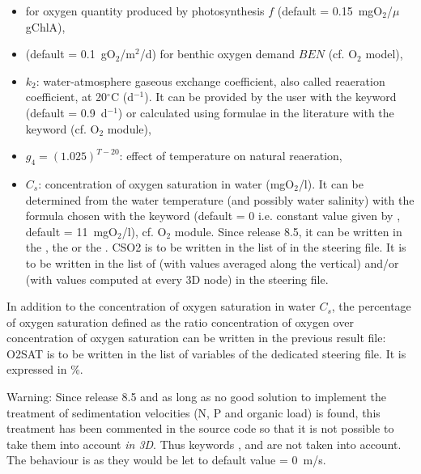 \begin{itemize}
\item {}
  for oxygen quantity produced by photosynthesis $f$
  (default = 0.15~mgO$_2$/$\mu$gChlA),
\item  {} (default = 0.1~gO$_2$/m$^2$/d)
  for benthic oxygen demand $BEN$ (cf. O$_2$ model),
\item $k_2$: water-atmosphere gaseous exchange coefficient,
  also called reaeration coefficient, at 20$^{\circ}$C (d$^{-1}$).
  It can be provided by the user with the keyword
   (default = 0.9~d$^{-1}$)
  or calculated using formulae in the literature
  with the keyword  (cf. O$_2$ module),
\item $g_4 = (1.025)^{T-20}$: effect of temperature on natural reaeration,
\item $C_s$: concentration of oxygen saturation in water (mgO$_2$/l).
  It can be determined from the water temperature
  (and possibly water salinity)
  with the formula chosen with the keyword
   (default = 0 i.e. constant value given by
  , default = 11~mgO$_2$/l),
  cf. O$_2$ module.
Since release 8.5, it can be written in the
 , the  
or the  .
CSO2 is to be written in the list of 
in the  steering file.
It is to be written in the list of 
(with values averaged along the vertical) and/or
 (with values computed at every
3D node) in the  steering file.
\end{itemize}


In addition to the concentration of oxygen saturation in water $C_s$, the
percentage of oxygen saturation defined as the ratio concentration of oxygen over
concentration of oxygen saturation can be written in the previous result file:
O2SAT is to be written in the list of variables of the dedicated \tel steering
file.
It is expressed in \%.

\begin{WarningBlock}{Warning:}
Since release 8.5 and as long as no good solution to implement the treatment of
sedimentation velocities (N, P and organic load) is found, this treatment has
been commented in the source code so that it is not possible to take them into
account \emph{in 3D}.
Thus keywords ,
 and
 are not taken into account.
The behaviour is as they would be let to default value = 0~m/s.
\end{WarningBlock}

